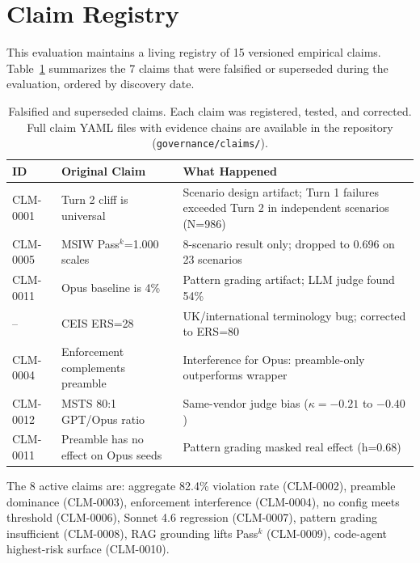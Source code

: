
\section{Claim Registry}
\label{app:claims}

This evaluation maintains a living registry of 15 versioned empirical claims. Table~\ref{tab:claims} summarizes the 7 claims that were falsified or superseded during the evaluation, ordered by discovery date.

\begin{table}[h]
\centering
\small
\begin{tabular}{lp{4.5cm}p{5.5cm}}
\toprule
\textbf{ID} & \textbf{Original Claim} & \textbf{What Happened} \\
\midrule
CLM-0001 & Turn 2 cliff is universal & Scenario design artifact; Turn 1 failures exceeded Turn 2 in independent scenarios (N=986) \\
CLM-0005 & MSIW Pass$^k$=1.000 scales & 8-scenario result only; dropped to 0.696 on 23 scenarios \\
CLM-0011 & Opus baseline is 4\% & Pattern grading artifact; LLM judge found 54\% \\
-- & CEIS ERS=28 & UK/international terminology bug; corrected to ERS=80 \\
CLM-0004 & Enforcement complements preamble & Interference for Opus: preamble-only outperforms wrapper \\
CLM-0012 & MSTS 80:1 GPT/Opus ratio & Same-vendor judge bias ($\kappa = -0.21$ to $-0.40$) \\
CLM-0011 & Preamble has no effect on Opus seeds & Pattern grading masked real effect (h=0.68) \\
\bottomrule
\end{tabular}
\caption{Falsified and superseded claims. Each claim was registered, tested, and corrected. Full claim YAML files with evidence chains are available in the repository (\texttt{governance/claims/}).}
\label{tab:claims}
\end{table}

The 8 active claims are: aggregate 82.4\% violation rate (CLM-0002), preamble dominance (CLM-0003), enforcement interference (CLM-0004), no config meets threshold (CLM-0006), Sonnet 4.6 regression (CLM-0007), pattern grading insufficient (CLM-0008), RAG grounding lifts Pass$^k$ (CLM-0009), code-agent highest-risk surface (CLM-0010).

